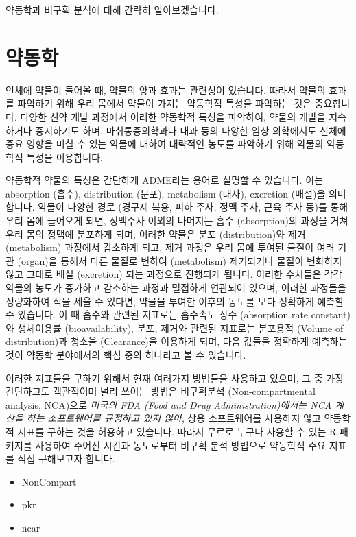 \documentclass[
  10pt,
]{krantz}
\providecommand{\tightlist}{%
  \setlength{\itemsep}{0pt}\setlength{\parskip}{0pt}}
\begin{document}
약동학과 비구획 분석에 대해 간략히 알아보겠습니다.

\hypertarget{PK-introduction}{%
\section{약동학}\label{PK-introduction}}

인체에 약물이 들어올 때, 약물의 양과 효과는 관련성이 있습니다.
따라서 약물의 효과를 파악하기 위해 우리 몸에서 약물이 가지는 약동학적 특성을 파악하는 것은 중요합니다.
다양한 신약 개발 과정에서 이러한 약동학적 특성을 파악하여, 약물의 개발을 지속하거나 중지하기도 하며, 마취통증의학과나 내과 등의 다양한 임상 의학에서도 신체에 중요 영향을 미칠 수 있는 약물에 대하여 대략적인 농도를 파악하기 위해 약물의 약동학적 특성을 이용합니다.

약동학적 약물의 특성은 간단하게 ADME라는 용어로 설명할 수 있습니다.
이는 absorption (흡수), distribution (분포), metabolism (대사), excretion (배설)을 의미합니다.
약물이 다양한 경로 (경구제 복용, 피하 주사, 정맥 주사, 근육 주사 등)를 통해 우리 몸에 들어오게 되면, 정맥주사 이외의 나머지는 흡수 (absorption)의 과정을 거쳐 우리 몸의 정맥에 분포하게 되며, 이러한 약물은 분포 (distribution)와 제거 (metabolism) 과정에서 감소하게 되고, 제거 과정은 우리 몸에 투여된 물질이 여러 기관 (organ)을 통해서 다른 물질로 변하여 (metabolism) 제거되거나 물질이 변화하지 않고 그대로 배설 (excretion) 되는 과정으로 진행되게 됩니다.
이러한 수치들은 각각 약물의 농도가 증가하고 감소하는 과정과 밀접하게 연관되어 있으며, 이러한 과정들을 정량화하여 식을 세울 수 있다면, 약물을 투여한 이후의 농도를 보다 정확하게 예측할 수 있습니다.
이 때 흡수와 관련된 지표로는 흡수속도 상수 (absorption rate constant)와 생체이용률 (bioavailability), 분포, 제거와 관련된 지표로는 분포용적 (Volume of distribution)과 청소율 (Clearance)을 이용하게 되며, 다음 값들을 정확하게 예측하는 것이 약동학 분야에서의 핵심 중의 하나라고 볼 수 있습니다.

이러한 지표들을 구하기 위해서 현재 여러가지 방법들을 사용하고 있으며, 그 중 가장 간단하고도 객관적이며 널리 쓰이는 방법은 비구획분석 (Non-compartmental analysis, NCA)으로 \emph{미국의 FDA (Food and Drug Administration)에서는 NCA 계산을 하는 소프트웨어를 규정하고 있지 않아}, 상용 소프트웨어를 사용하지 않고 약동학적 지표를 구하는 것을 허용하고 있습니다.
따라서 무료로 누구나 사용할 수 있는 R 패키지를 사용하여 주어진 시간과 농도로부터 비구획 분석 방법으로 약동학적 주요 지표를 직접 구해보고자 합니다.

\begin{itemize}
\tightlist
\item
  NonCompart \citep{R-NonCompart}
\item
  pkr \citep{R-pkr}
\item
  ncar \citep{R-ncar}
\end{itemize}
\end{document}
